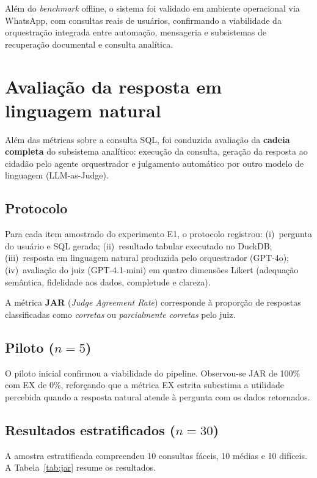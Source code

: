 Além do \textit{benchmark} offline, o sistema foi validado em ambiente operacional via WhatsApp, com consultas reais de usuários, confirmando a viabilidade da orquestração integrada entre automação, mensageria e subsistemas de recuperação documental e consulta analítica.
\section{Avaliação da resposta em linguagem natural}

Além das métricas sobre a consulta SQL, foi conduzida avaliação da \textbf{cadeia completa} do subsistema analítico: execução da consulta, geração da resposta ao cidadão pelo agente orquestrador e julgamento automático por outro modelo de linguagem (LLM-as-Judge).

\subsection{Protocolo}

Para cada item amostrado do experimento E1, o protocolo registrou: (i)~pergunta do usuário e SQL gerada; (ii)~resultado tabular executado no DuckDB; (iii)~resposta em linguagem natural produzida pelo orquestrador (GPT-4o); (iv)~avaliação do juiz (GPT-4.1-mini) em quatro dimensões Likert (adequação semântica, fidelidade aos dados, completude e clareza).

A métrica \textbf{JAR} (\textit{Judge Agreement Rate}) corresponde à proporção de respostas classificadas como \textit{corretas} ou \textit{parcialmente corretas} pelo juiz.

\subsection{Piloto ($n=5$)}

O piloto inicial confirmou a viabilidade do pipeline. Observou-se JAR de 100\% com EX de 0\%, reforçando que a métrica EX estrita subestima a utilidade percebida quando a resposta natural atende à pergunta com os dados retornados.

\subsection{Resultados estratificados ($n=30$)}

A amostra estratificada compreendeu 10 consultas fáceis, 10 médias e 10 difíceis. A Tabela~\ref{tab:jar} resume os resultados.

